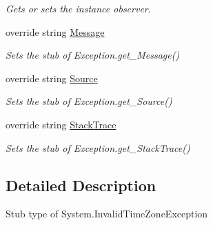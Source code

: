 \begin{DoxyCompactItemize}
\begin{DoxyCompactList}\small\item\em Gets or sets the instance observer.\end{DoxyCompactList}\item 
override string \hyperlink{class_system_1_1_fakes_1_1_stub_invalid_time_zone_exception_a53284d56fd5b32814f01f544e061d2d8}{Message}
\begin{DoxyCompactList}\small\item\em Sets the stub of Exception.\-get\-\_\-\-Message()\end{DoxyCompactList}\item 
override string \hyperlink{class_system_1_1_fakes_1_1_stub_invalid_time_zone_exception_af06d914f5a5e529fef21f9e656b0b2ab}{Source}
\begin{DoxyCompactList}\small\item\em Sets the stub of Exception.\-get\-\_\-\-Source()\end{DoxyCompactList}\item 
override string \hyperlink{class_system_1_1_fakes_1_1_stub_invalid_time_zone_exception_abcdac2cc2f58f34a302932a7b7ac90a9}{Stack\-Trace}
\begin{DoxyCompactList}\small\item\em Sets the stub of Exception.\-get\-\_\-\-Stack\-Trace()\end{DoxyCompactList}\end{DoxyCompactItemize}


\subsection{Detailed Description}
Stub type of System.\-Invalid\-Time\-Zone\-Exception



